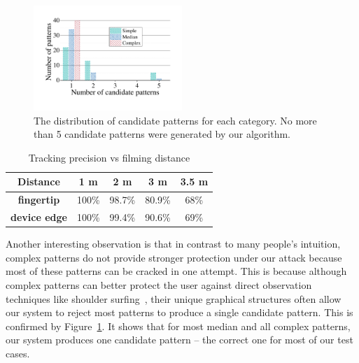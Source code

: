 \begin{figure}[!t]
    \centering
    \includegraphics[width=0.5\textwidth]{fig/11.pdf}
    \caption{The distribution of candidate patterns for each category. No more than 5 candidate patterns were generated by our algorithm. }
    \label{fig:fig11}
\end{figure}
 \begin{table}[!t]
            \centering
            \caption{Tracking precision vs filming distance}
            \vspace{-0.2mm}
            \label{tab:tab1}
            \small
            \begin{tabular}{ccccc}
                \toprule
                \textbf{Distance}& 1 m & 2 m & 3 m & 3.5 m \\
                \midrule
                \textbf{fingertip}  & 100\% & 98.7\% & 80.9\% & 68\% \\
                \textbf{device edge} & 100\% & 99.4\% & 90.6\% & 69\% \\
                \bottomrule
            \end{tabular}
            \vspace{-5mm}
        \end{table}
        Another interesting observation is that in contrast to many people's
        intuition, complex patterns do not provide stronger protection under our attack because
        most of these patterns can be cracked in one attempt.
        This is because although complex patterns can better protect the user against direct observation techniques like shoulder surfing~\cite{shoulder}, their unique graphical structures
        often allow our system to reject most patterns to produce a single candidate pattern. This is
        confirmed by Figure~\ref{fig:fig11}. It shows that for most median and all complex patterns, our system produces one candidate pattern --
        the correct one for most of our test cases.



